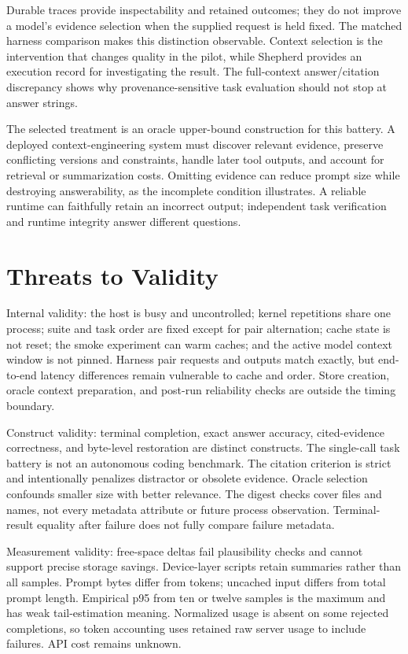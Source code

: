 \documentclass[11pt,a4paper]{article}
\begin{document}
Durable traces provide inspectability and retained outcomes; they do not improve a model's evidence selection when the supplied request is held fixed. The matched harness comparison makes this distinction observable. Context selection is the intervention that changes quality in the pilot, while Shepherd provides an execution record for investigating the result. The full-context answer/citation discrepancy shows why provenance-sensitive task evaluation should not stop at answer strings.


The selected treatment is an oracle upper-bound construction for this battery. A deployed context-engineering system must discover relevant evidence, preserve conflicting versions and constraints, handle later tool outputs, and account for retrieval or summarization costs. Omitting evidence can reduce prompt size while destroying answerability, as the incomplete condition illustrates. A reliable runtime can faithfully retain an incorrect output; independent task verification and runtime integrity answer different questions.


\section{Threats to Validity}

Internal validity: the host is busy and uncontrolled; kernel repetitions share one process; suite and task order are fixed except for pair alternation; cache state is not reset; the smoke experiment can warm caches; and the active model context window is not pinned. Harness pair requests and outputs match exactly, but end-to-end latency differences remain vulnerable to cache and order. Store creation, oracle context preparation, and post-run reliability checks are outside the timing boundary.


Construct validity: terminal completion, exact answer accuracy, cited-evidence correctness, and byte-level restoration are distinct constructs. The single-call task battery is not an autonomous coding benchmark. The citation criterion is strict and intentionally penalizes distractor or obsolete evidence. Oracle selection confounds smaller size with better relevance. The digest checks cover files and names, not every metadata attribute or future process observation. Terminal-result equality after failure does not fully compare failure metadata.


Measurement validity: free-space deltas fail plausibility checks and cannot support precise storage savings. Device-layer scripts retain summaries rather than all samples. Prompt bytes differ from tokens; uncached input differs from total prompt length. Empirical p95 from ten or twelve samples is the maximum and has weak tail-estimation meaning. Normalized usage is absent on some rejected completions, so token accounting uses retained raw server usage to include failures. API cost remains unknown.
\end{document}
